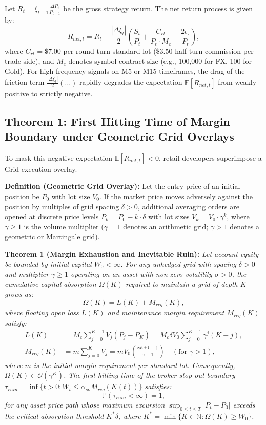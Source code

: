 \documentclass[11pt,a4paper]{article}
\begin{document}
Let $R_t = \xi_{t-1} \frac{\Delta P_t}{P_{t-1}}$ be the gross strategy return. The net return process is given by:
\begin{equation}
R_{net, t} = R_t - \frac{|\Delta \xi_t|}{2} \left( \frac{S_t}{P_t} + \frac{C_{rt}}{P_t \cdot M_c} + \frac{2\epsilon_{\tau}}{P_t} \right),
\end{equation}
where $C_{rt} = \$7.00$ per round-turn standard lot (\$3.50 half-turn commission per trade side), and $M_c$ denotes symbol contract size (e.g., 100,000 for FX, 100 for Gold). For high-frequency signals on M5 or M15 timeframes, the drag of the friction term $\frac{|\Delta \xi_t|}{2} (\dots)$ rapidly degrades the expectation $\mathbb{E}[R_{net, t}]$ from weakly positive to strictly negative.

\subsection{Theorem 1: First Hitting Time of Margin Boundary under Geometric Grid Overlays}
To mask this negative expectation $\mathbb{E}[R_{net, t}] < 0$, retail developers superimpose a Grid execution overlay.

\textbf{Definition (Geometric Grid Overlay):} Let the entry price of an initial position be $P_0$ with lot size $V_0$. If the market price moves adversely against the position by multiples of grid spacing $\delta > 0$, additional averaging orders are opened at discrete price levels $P_k = P_0 - k \cdot \delta$ with lot sizes $V_k = V_0 \cdot \gamma^k$, where $\gamma \ge 1$ is the volume multiplier ($\gamma = 1$ denotes an arithmetic grid; $\gamma > 1$ denotes a geometric or Martingale grid).

\textbf{Theorem 1 (Margin Exhaustion and Inevitable Ruin):} \textit{Let account equity be bounded by initial capital $W_0 < \infty$. For any unhedged grid with spacing $\delta > 0$ and multiplier $\gamma \ge 1$ operating on an asset with non-zero volatility $\sigma > 0$, the cumulative capital absorption $\Omega(K)$ required to maintain a grid of depth $K$ grows as:}
\begin{equation}
\Omega(K) = L(K) + M_{req}(K),
\end{equation}
\textit{where floating open loss $L(K)$ and maintenance margin requirement $M_{req}(K)$ satisfy:}
\begin{align}
L(K) &= M_c \sum_{j=0}^{K-1} V_j (P_j - P_K) = M_c \delta V_0 \sum_{j=0}^{K-1} \gamma^j (K - j), \\
M_{req}(K) &= m \sum_{j=0}^K V_j = m V_0 \left( \frac{\gamma^{K+1}-1}{\gamma-1} \right) \quad (\text{for } \gamma > 1),
\end{align}
\textit{where $m$ is the initial margin requirement per standard lot. Consequently, $\Omega(K) \in \mathcal{O}(\gamma^K)$. The first hitting time of the broker stop-out boundary $\tau_{ruin} = \inf \{t > 0 : W_t \le \alpha_{so} M_{req}(K(t))\}$ satisfies:}
\begin{equation}
\mathbb{P}(\tau_{ruin} < \infty) = 1,
\end{equation}
\textit{for any asset price path whose maximum excursion $\sup_{0 \le t \le T} |P_t - P_0|$ exceeds the critical absorption threshold $K^* \delta$, where $K^* = \min \{K \in \mathbb{N} : \Omega(K) \ge W_0\}$.}
\end{document}
